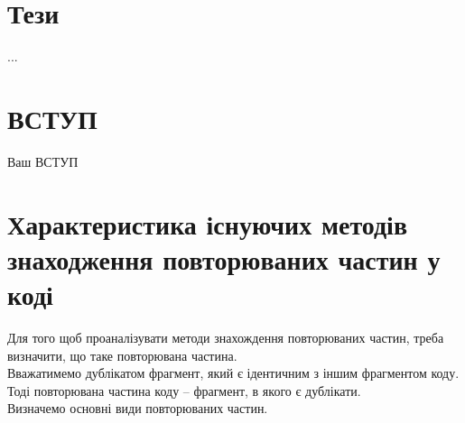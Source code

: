 \documentclass[a4paper, 14pt]{article}
\begin{document}
\section*{Т\lowercase{ези}}
...
\newpage
\tableofcontents %
\newpage
\section*{\textbf{ВСТУП}}
Ваш ВСТУП
\newpage %
\section{Характеристика існуючих методів знаходження повторюваних частин у коді}
Для того щоб проаналізувати методи знахождення повторюваних частин, треба визначити, що таке повторювана частина. \\
Вважатимемо дублікатом фрагмент, який є ідентичним з іншим фрагментом коду. \\
Тоді повторювана частина коду -- фрагмент, в якого є дублікати. \\
Визначемо основні види повторюваних частин.
\end{document}

